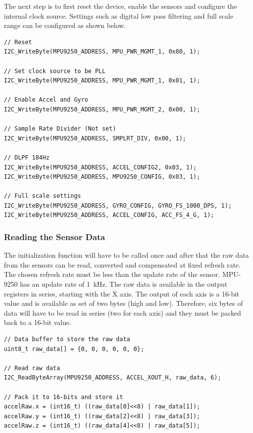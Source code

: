\documentclass[a4paper,12pt,oneside]{book}
\begin{document}
\bigskip
The next step is to first reset the device, enable the sensors and configure the internal clock source. Settings such as digital low pass filtering and full scale range can be configured as shown below.\\

\begin{verbatim}
// Reset
I2C_WriteByte(MPU9250_ADDRESS, MPU_PWR_MGMT_1, 0x80, 1);
 
// Set clock source to be PLL
I2C_WriteByte(MPU9250_ADDRESS, MPU_PWR_MGMT_1, 0x01, 1); 
 
// Enable Accel and Gyro
I2C_WriteByte(MPU9250_ADDRESS, MPU_PWR_MGMT_2, 0x00, 1); 
 
// Sample Rate Divider (Not set) 
I2C_WriteByte(MPU9250_ADDRESS, SMPLRT_DIV, 0x00, 1); 
 
// DLPF 184Hz 
I2C_WriteByte(MPU9250_ADDRESS, ACCEL_CONFIG2, 0x03, 1); 
I2C_WriteByte(MPU9250_ADDRESS, MPU9250_CONFIG, 0x03, 1);

// Full scale settings
I2C_WriteByte(MPU9250_ADDRESS, GYRO_CONFIG, GYRO_FS_1000_DPS, 1);
I2C_WriteByte(MPU9250_ADDRESS, ACCEL_CONFIG, ACC_FS_4_G, 1);
\end{verbatim}

\clearpage

\subsubsection{Reading the Sensor Data}
The initialization function will have to be called once and after that the raw data from the sensors can be read, converted and compensated at fixed refresh rate. The chosen refresh rate must be less than the update rate of the sensor. MPU-9250 has an update rate of \SI{1}{\kilo\hertz}. The raw data is available in the output registers in series, starting with the X axis. The output of each axis is a 16-bit value and is available as set of two bytes (high and low). Therefore, six bytes of data will have to be read in series (two for each axis) and they must be packed back to a 16-bit value.\\

\begin{verbatim}
// Data buffer to store the raw data
uint8_t raw_data[] = {0, 0, 0, 0, 0, 0};

// Read raw data
I2C_ReadByteArray(MPU9250_ADDRESS, ACCEL_XOUT_H, raw_data, 6);

// Pack it to 16-bits and store it
accelRaw.x = (int16_t) ((raw_data[0]<<8) | raw_data[1]);
accelRaw.y = (int16_t) ((raw_data[2]<<8) | raw_data[3]);
accelRaw.z = (int16_t) ((raw_data[4]<<8) | raw_data[5]);
\end{verbatim}
\end{document}
